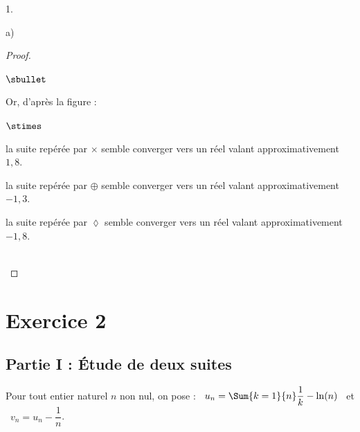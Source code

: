 \documentclass[11pt]{article}%
\begin{document}
\begin{noliste}{1.}
\begin{noliste}{a)}
\begin{proof}
\begin{noliste}{$\sbullet$}
      \item Or, d'après la figure :
        \begin{noliste}{$\stimes$}
        \item la suite repérée par $\times$ semble converger vers un
          réel valant approximativement $1,8$.%
        \item la suite repérée par $\oplus$ semble converger vers un
          réel valant approximativement $-1,3$.%
        \item la suite repérée par $\lozenge$ semble converger vers un
          réel valant approximativement $-1,8$.%
        \end{noliste}
      \end{noliste}
      ~\\[-1.2cm]
    \end{proof}
  \end{noliste}
\end{noliste}

\section*{Exercice 2}

\subsection*{Partie I : Étude de deux suites}

\noindent
Pour tout entier naturel $n$ non nul, on pose : \ $u_{n} = \Sum{k =
  1}{n} \dfrac{1}{k} - \ln(n)$ \ et \ $v_{n} = u_{n} - \dfrac{1}{n}$.
\end{document}
